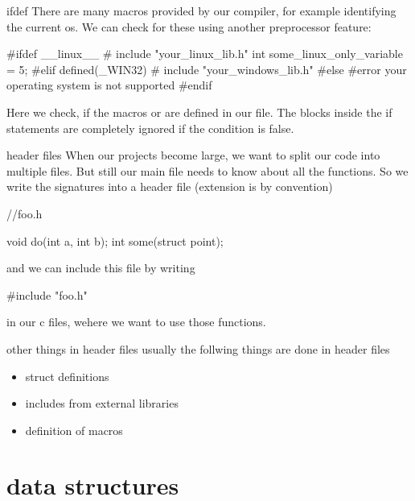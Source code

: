 \documentclass[10pt,graphics,aspectratio=169,table]{beamer}
\begin{document}
\begin{frame}[fragile]{ifdef}
There are many macros provided by our compiler,
for example identifying the current os.
We can check for these using another preprocessor feature: 
\begin{codeblock}
#ifdef __linux__
#   include "your_linux_lib.h"
    int some_linux_only_variable = 5;
#elif defined(_WIN32)
#   include "your_windows_lib.h"
#else
#error your operating system is not supported
#endif
\end{codeblock}

Here we check, if the macros  or  are defined
in our file. The blocks inside the if statements
are completely ignored if the condition is false.
\end{frame}

\begin{frame}[fragile]{header files}
When our projects become large, we want to split our code into multiple files.
But still our main file needs to know about all the functions. So we write the
signatures into a header file (extension is  by convention)

\begin{codeblock}
//foo.h

void do(int a, int b);
int some(struct point);
\end{codeblock}

and we can include this file by writing
\begin{codeblock}
#include "foo.h"
\end{codeblock}
in our c files, wehere we want to use those functions.
\end{frame}

\begin{frame}{other things in header files}
usually the follwing things are done in header files
\begin{itemize}
\item struct definitions
\item includes from external libraries
\item definition of macros
\end{itemize}
\end{frame}

\section{data structures}
\end{document}
